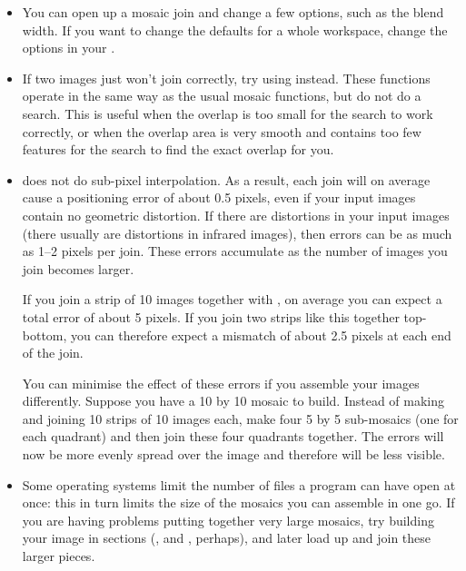 \begin{itemize}

\item
You can open up a mosaic join and change a few options, such as the blend
width. If you want to change the defaults for a whole workspace, change the
 options in your .

\item
If two images just won't join correctly, try using 
 instead.  These functions operate in the same way as the usual
mosaic functions, but do not do a search. 
This is useful when the overlap is too small for the search
to work correctly, or when the overlap area is very smooth and contains
too few features for the search to find the exact overlap for you.

\item
\nip{} does not do sub-pixel interpolation. As a result, each join will on
average cause a positioning error of about 0.5 pixels, even if your input
images contain no geometric distortion. If there are distortions in your input
images (there usually are distortions in infrared images), then errors can be
as much as 1--2 pixels per join. These errors accumulate as the number of
images you join becomes larger.

If you join a strip of 10 images together with
, on average you
can expect a total error of about 5 pixels. If you join two strips like
this together top-bottom, you can therefore expect a mismatch of about 2.5
pixels at each end of the join.

You can minimise the effect of these errors if you assemble your images
differently. Suppose you have a 10 by 10 mosaic to build.  Instead of making
and joining 10 strips of 10 images each, make four 5 by 5 sub-mosaics (one for
each quadrant) and then join these four quadrants together.  The errors will
now be more evenly spread over the image and therefore will be less visible.

\item
{}
Some operating systems limit the number of files a program can have open
at once: this in turn limits the size of the mosaics you can assemble in
one go.  If you are having problems putting together very large mosaics, try
building your image in sections (,  and ,
perhaps), and later load up and join these larger pieces.

\end{itemize}

